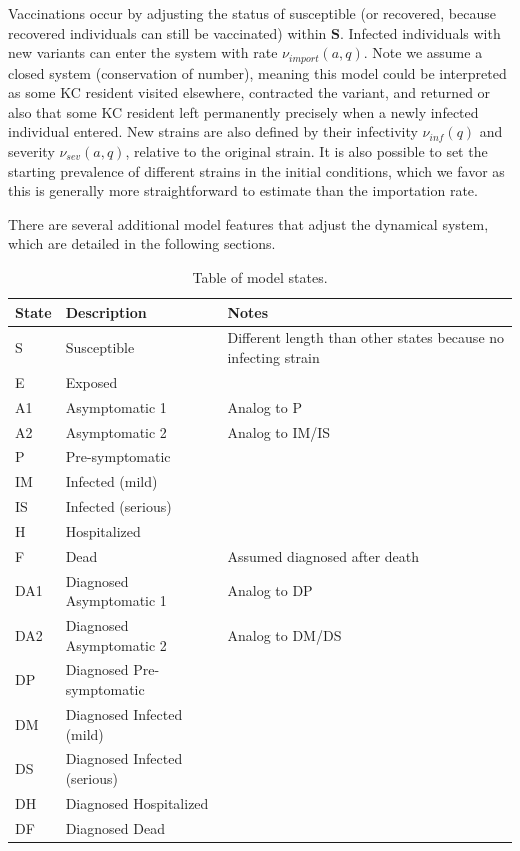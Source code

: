 \documentclass[11pt]{article}
\begin{document}
Vaccinations occur by adjusting the status of susceptible (or recovered, because recovered individuals can still be vaccinated) within $\mathbf{S}$. Infected individuals with new variants can enter the system with rate $\nu_{import}(a,q)$. Note we assume a closed system (conservation of number), meaning this model could be interpreted as some KC resident visited elsewhere, contracted the variant, and returned or also that some KC resident left permanently precisely when a newly infected individual entered. New strains are also defined by their infectivity $\nu_{inf}(q)$ and severity $\nu_{sev}(a,q)$, relative to the original strain.
It is also possible to set the starting prevalence of different strains in the initial conditions, which we favor as this is generally more straightforward to estimate than the importation rate. 

There are several additional model features that adjust the dynamical system, which are detailed in the following sections. 

\begin{table}[h]
\caption{Table of model states.}
\label{tab:states}
\begin{tabular}{l | ll}
State  & Description & Notes \\
\hline
S & Susceptible      & Different length than other states because no infecting strain    \\
E & Exposed      &     \\
A1 & Asymptomatic 1   & Analog to P    \\
A2 & Asymptomatic 2   &Analog to IM/IS \\
P & Pre-symptomatic      &     \\
IM & Infected (mild)   &    \\
IS & Infected (serious)   & \\
H & Hospitalized      &     \\
F & Dead   &  Assumed diagnosed after death   \\
DA1 & Diagnosed Asymptomatic 1   & Analog to DP    \\
DA2 & Diagnosed Asymptomatic 2   &Analog to DM/DS \\
DP & Diagnosed Pre-symptomatic      &     \\
DM & Diagnosed Infected (mild)   &    \\
DS & Diagnosed Infected (serious)   & \\
DH & Diagnosed Hospitalized      &     \\
DF & Diagnosed Dead   &     
\end{tabular}
\end{table}
\end{document}
